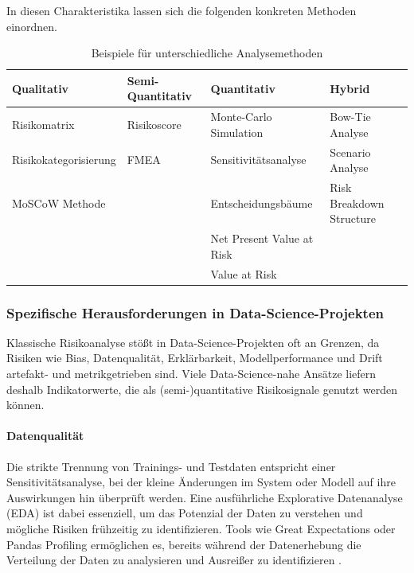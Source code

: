 In diesen Charakteristika lassen sich die folgenden konkreten Methoden einordnen.
\begin{table}[H]
    \centering
    \label{tab:unterschiedliche_analysemethoden}
    \footnotesize
    \begin{tabular}{|p{3.3cm}|p{2.5cm}|p{3.8cm}|p{4.1cm}|}
        \hline
        \textbf{Qualitativ} & \textbf{Semi-Quantitativ} & \textbf{Quantitativ} & \textbf{Hybrid} \\
        \hline
        Risikomatrix & Risikoscore & Monte-Carlo Simulation & Bow-Tie Analyse \\
        
        Risikokategorisierung & FMEA & Sensitivitätsanalyse & Scenario Analyse \\
        
        MoSCoW Methode  & & Entscheidungsbäume & Risk Breakdown Structure \\
        
         & & Net Present Value at Risk & \\
         
         & & Value at Risk & \\
        \hline
    \end{tabular}
    \caption{Beispiele für unterschiedliche Analysemethoden}
\end{table}

\subsubsection*{Spezifische Herausforderungen in Data-Science-Projekten}
Klassische Risikoanalyse stößt in Data-Science-Projekten oft an Grenzen, da Risiken wie Bias,
Datenqualität, Erklärbarkeit, Modellperformance und Drift artefakt- und metrikgetrieben sind.
Viele Data-Science-nahe Ansätze liefern deshalb Indikatorwerte, die als (semi-)quantitative Risikosignale genutzt werden können.

\paragraph*{Datenqualität}
Die strikte Trennung von Trainings- und Testdaten entspricht einer Sensitivitätsanalyse, 
bei der kleine Änderungen im System oder Modell auf ihre Auswirkungen hin überprüft werden. 
Eine ausführliche Explorative Datenanalyse (EDA) ist dabei essenziell, 
um das Potenzial der Daten zu verstehen und mögliche Risiken frühzeitig zu identifizieren. 
Tools wie Great Expectations oder Pandas Profiling ermöglichen es, 
bereits während der Datenerhebung die Verteilung der Daten zu analysieren und Ausreißer zu identifizieren \citep{gong_great_2026, noauthor_data-centric-ai-communityfg-data-profiling_2026}.
